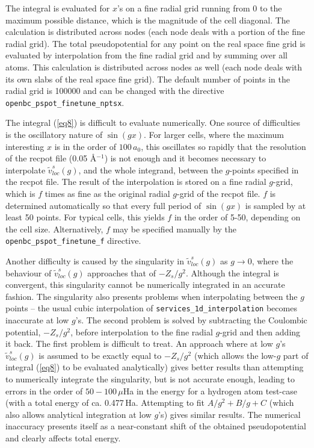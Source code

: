 \documentclass[a4paper,oneside,11pt]{article}
\newcommand{\vlocgs}{\tilde{v}^s_{loc}\left(g\right)}
\begin{document}
The integral is evaluated for $x$'s on a fine radial grid running from $0$ to the maximum possible distance, which is the magnitude of the cell diagonal. The calculation is distributed across nodes (each node deals with a portion of the fine radial grid). 
The total pseudopotential for any point on the real space fine grid is evaluated by interpolation from the fine radial grid and by summing over all atoms. This calculation is distributed across nodes as well (each node deals with its own slabs of the real space fine grid). The default number of points in the radial grid is 100000 and can be changed with the directive \texttt{openbc\_pspot\_finetune\_nptsx}.

The integral (\ref{eq8}) is difficult to evaluate numerically. One source of difficulties is the oscillatory nature of $\sin\left(gx\right)$. For larger cells, where the maximum interesting $x$ is in the order of $100\,a_0$, this oscillates so rapidly that the resolution of the recpot file (0.05 \AA$^{-1}$) is not enough and it becomes necessary to interpolate $\vlocgs$, and the whole integrand, between the $g$-points specified in the recpot file. The result of the interpolation is stored on a fine radial $g$-grid, which is $f$ times as fine as the original radial $g$-grid of the recpot file. $f$ is determined automatically so that every full period of $\sin\left(gx\right)$ is sampled by at least 50 points. For typical cells, this yields $f$ in the order of 5-50, depending on the cell size.
Alternatively, $f$ may be specified manually by the \texttt{openbc\_pspot\_finetune\_f} directive.

Another difficulty is caused by the singularity in $\vlocgs$ as $g\to0$, where the behaviour of $\vlocgs$ approaches that of $-Z_s/g^2$. Although the integral is convergent, this singularity cannot be numerically integrated in an accurate fashion. The singularity also presents problems when interpolating between the $g$ points -- the usual cubic interpolation of \texttt{services\_1d\_interpolation} becomes inaccurate at low $g$'s. The second problem is solved by subtracting the Coulombic potential, $-Z_s/g^2$, before interpolation to the fine radial $g$-grid and then adding it back. The first problem is difficult to treat. An approach where at low $g$'s $\vlocgs$ is assumed to be exactly equal to $-Z_s/g^2$ (which allows the low-$g$ part of integral (\ref{eq8}) to be evaluated analytically) gives better results than attempting to numerically integrate the singularity, but is not accurate enough, leading to errors in the order of $50-100\,\mu{}$Ha in the energy for a hydrogen atom test-case (with a total energy of ca. 0.477\,Ha. Attempting to fit $A/g^2+B/g+C$ (which also allows analytical integration at low $g$'s) gives similar results. 
The numerical inaccuracy presents itself as a near-constant shift of the obtained pseudopotential and clearly affects total energy.
\end{document}
